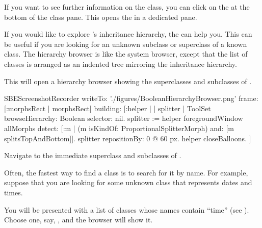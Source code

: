 \documentclass[a4paper,10pt,twoside]{book}
\begin{document}
If you want to see further information on the class, you can click on the  at the bottom of the class pane.
This opens the  in a dedicated pane.

If you would like to explore \sq's inheritance hierarchy, the  can help you.
This can be useful if you are looking for an unknown subclass or superclass of a known class.
The hierarchy browser is like the system browser, except that the list of classes is arranged as an indented tree mirroring the inheritance hierarchy.

\noindent
This will open a hierarchy browser showing the superclasses and subclasses of .

\begin{ExecuteSmalltalkScript}
SBEScreenshotRecorder writeTo: './figures/BooleanHierarchyBrowser.png' frame: [:morphsRect | morphsRect] building: [:helper |
	| splitter |
	ToolSet browseHierarchy: Boolean selector: nil.
	splitter := helper foregroundWindow allMorphs detect: [:m |
		(m isKindOf: ProportionalSplitterMorph) and: [m splitsTopAndBottom]].
	splitter repositionBy: 0 @ 60 px.
	helper closeBalloons.
]
\end{ExecuteSmalltalkScript}

Navigate to the immediate superclass and subclasses of .

Often, the fastest way to find a class is to search for it by name.
For example, suppose that you are looking for some unknown class that represents dates and times.

\noindent
You will be presented with a list of classes whose names contain ``time'' (see ).
Choose one, say, , and the browser will show it.
\end{document}
